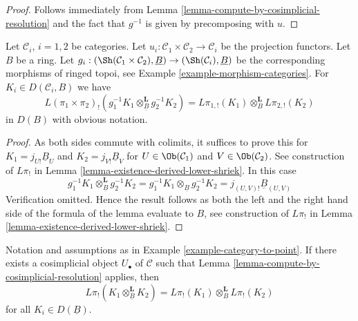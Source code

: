 \begin{proof}
Follows immediately from
Lemma \ref{lemma-compute-by-cosimplicial-resolution}
and the fact that $g^{-1}$ is given by precomposing with $u$.
\end{proof}

\begin{lemma}
\label{lemma-product-categories}
Let $\mathcal{C}_i$, $i = 1, 2$ be categories. Let
$u_i : \mathcal{C}_1 \times \mathcal{C}_2 \to \mathcal{C}_i$ be the
projection functors. Let $B$ be a ring. Let
$g_i : (\Sh(\mathcal{C}_1 \times \mathcal{C}_2), \underline{B}) \to
(\Sh(\mathcal{C}_i), \underline{B})$ be the corresponding morphisms
of ringed topoi, see Example \ref{example-morphism-categories}. For
$K_i \in D(\mathcal{C}_i, B)$ we have
$$
L(\pi_1 \times \pi_2)_!(
g_1^{-1}K_1 \otimes_{\underline{B}}^\mathbf{L} g_2^{-1}K_2)
=
L\pi_{1, !}(K_1) \otimes_B^\mathbf{L} L\pi_{2, !}(K_2)
$$
in $D(B)$ with obvious notation.
\end{lemma}

\begin{proof}
As both sides commute with colimits, it suffices to prove this for
$K_1 = j_{U!}\underline{B}_U$ and $K_2 = j_{V!}\underline{B}_V$
for $U \in \Ob(\mathcal{C}_1)$ and $V \in \Ob(\mathcal{C}_2)$.
See construction of $L\pi_!$ in
Lemma \ref{lemma-existence-derived-lower-shriek}.
In this case
$$
g_1^{-1}K_1 \otimes_{\underline{B}}^\mathbf{L} g_2^{-1}K_2 =
g_1^{-1}K_1 \otimes_{\underline{B}} g_2^{-1}K_2 =
j_{(U, V)!}\underline{B}_{(U, V)}
$$
Verification omitted. Hence the result follows as both the left and
the right hand side of the formula of the lemma evaluate to $B$, see
construction of $L\pi_!$ in Lemma \ref{lemma-existence-derived-lower-shriek}.
\end{proof}

\begin{lemma}
\label{lemma-eilenberg-zilber}
Notation and assumptions as in Example \ref{example-category-to-point}.
If there exists a cosimplicial object $U_\bullet$ of $\mathcal{C}$
such that Lemma \ref{lemma-compute-by-cosimplicial-resolution}
applies, then
$$
L\pi_!(K_1 \otimes^\mathbf{L}_{\underline{B}} K_2) =
L\pi_!(K_1) \otimes^\mathbf{L}_B L\pi_!(K_2)
$$
for all $K_i \in D(\underline{B})$.
\end{lemma}

